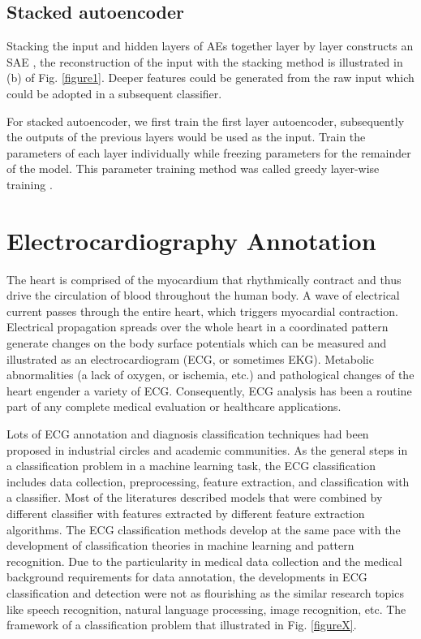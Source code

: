 \documentclass[journal]{IEEEtran}
\begin{document}
\subsection{Stacked autoencoder}
Stacking the input and hidden layers of AEs together layer by layer constructs an SAE \cite{chen2014deep}, the reconstruction of the input with the stacking method is illustrated in (b) of Fig. \ref{figure1}. Deeper features could be generated from the raw input which could be adopted in a subsequent classifier. 

For stacked autoencoder, we first train the first layer autoencoder, subsequently the outputs of the previous layers would be used as the input. Train the parameters of each layer individually while freezing parameters for the remainder of the model. This parameter training method was called greedy layer-wise training \cite{bengio2007greedy}.

\section{Electrocardiography Annotation}
The heart is comprised of the myocardium that rhythmically contract and thus drive the circulation of blood throughout the human body. A wave of electrical current passes through the entire heart, which triggers myocardial contraction\cite{clifford}. Electrical propagation spreads over the whole heart in a coordinated pattern generate changes on the body surface potentials which can be measured and illustrated as an electrocardiogram (ECG, or sometimes EKG). Metabolic abnormalities (a lack of oxygen, or ischemia, etc.) and pathological changes of the heart engender a variety of ECG. Consequently, ECG analysis has been a routine part of any complete medical evaluation or healthcare applications. 

Lots of ECG annotation and diagnosis classification techniques had been proposed in industrial circles and academic communities. As the general steps in a classification problem in a machine learning task, the ECG classification includes data collection, preprocessing, feature extraction, and classification with a classifier. Most of the literatures described models that were combined by different classifier with features extracted by different feature extraction algorithms. The ECG classification methods develop at the same pace with the development of classification theories in machine learning and pattern recognition. Due to the particularity in medical data collection and the medical background requirements for data annotation, the developments in ECG classification and detection were not as flourishing as the similar research topics like speech recognition, natural language processing, image recognition, etc. The framework of a classification problem that illustrated in Fig. \ref{figureX}.
\end{document}
